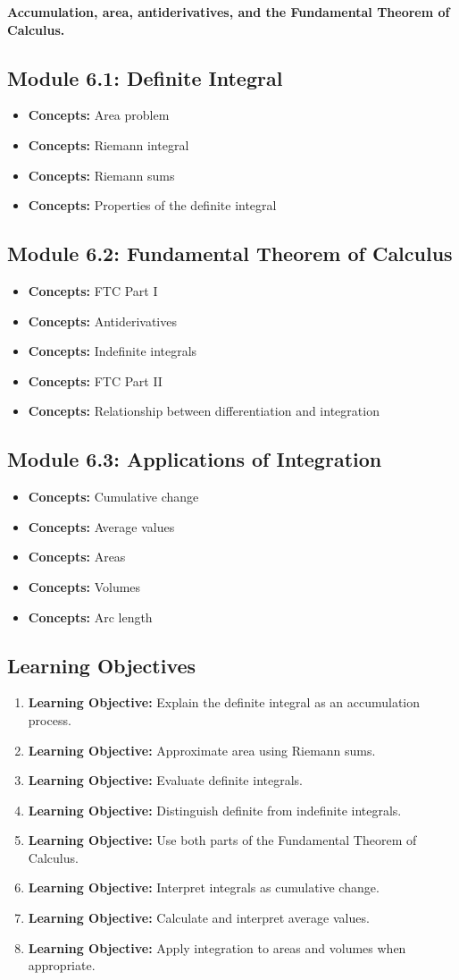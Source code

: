 \documentclass[11pt]{article}
\newcommand{\objective}[1]{\item \textbf{Learning Objective:} #1}
\newcommand{\concept}[1]{\item \textbf{Concepts:} #1}
\begin{document}
\textbf{Accumulation, area, antiderivatives, and the Fundamental
Theorem of Calculus.}

\subsection{Module 6.1: Definite Integral}

\begin{itemize}
    \concept{Area problem}
    \concept{Riemann integral}
    \concept{Riemann sums}
    \concept{Properties of the definite integral}
\end{itemize}

\subsection{Module 6.2: Fundamental Theorem of Calculus}

\begin{itemize}
    \concept{FTC Part I}
    \concept{Antiderivatives}
    \concept{Indefinite integrals}
    \concept{FTC Part II}
    \concept{Relationship between differentiation and integration}
\end{itemize}

\subsection{Module 6.3: Applications of Integration}

\begin{itemize}
    \concept{Cumulative change}
    \concept{Average values}
    \concept{Areas}
    \concept{Volumes}
    \concept{Arc length}
\end{itemize}

\subsection{Learning Objectives}

\begin{enumerate}
    \objective{Explain the definite integral as an accumulation process.}
    \objective{Approximate area using Riemann sums.}
    \objective{Evaluate definite integrals.}
    \objective{Distinguish definite from indefinite integrals.}
    \objective{Use both parts of the Fundamental Theorem of Calculus.}
    \objective{Interpret integrals as cumulative change.}
    \objective{Calculate and interpret average values.}
    \objective{Apply integration to areas and volumes when appropriate.}
\end{enumerate}
\end{document}
